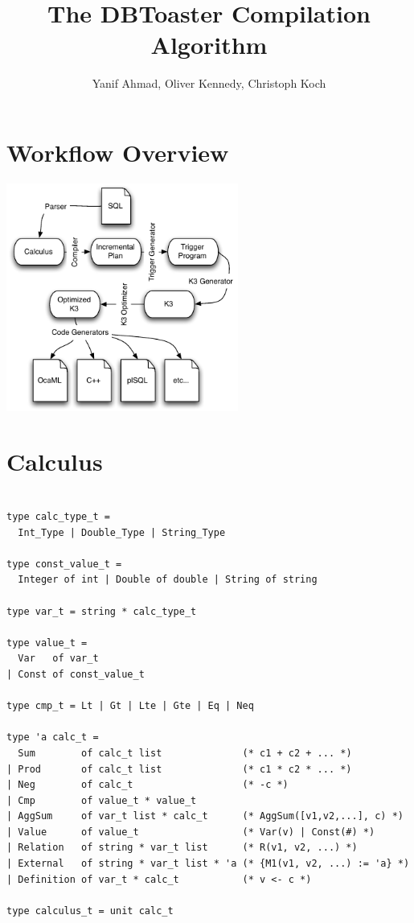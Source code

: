 \documentclass[11pt]{amsart}
\title{The DBToaster Compilation Algorithm}
\author{Yanif Ahmad, Oliver Kennedy, Christoph Koch}
\begin{document}
\maketitle

\section{Workflow Overview}

\includegraphics[width=3in]{CompilerFlow}


\section{Calculus}

\begin{verbatim}

type calc_type_t = 
  Int_Type | Double_Type | String_Type

type const_value_t = 
  Integer of int | Double of double | String of string

type var_t = string * calc_type_t

type value_t = 
  Var   of var_t
| Const of const_value_t

type cmp_t = Lt | Gt | Lte | Gte | Eq | Neq

type 'a calc_t =
  Sum        of calc_t list              (* c1 + c2 + ... *)
| Prod       of calc_t list              (* c1 * c2 * ... *)
| Neg        of calc_t                   (* -c *)
| Cmp        of value_t * value_t        
| AggSum     of var_t list * calc_t      (* AggSum([v1,v2,...], c) *)
| Value      of value_t                  (* Var(v) | Const(#) *)
| Relation   of string * var_t list      (* R(v1, v2, ...) *)
| External   of string * var_t list * 'a (* {M1(v1, v2, ...) := 'a} *)
| Definition of var_t * calc_t           (* v <- c *)

type calculus_t = unit calc_t
\end{verbatim}
\end{document}
